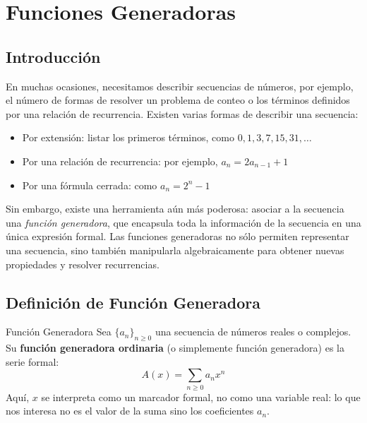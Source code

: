 

\section{Funciones Generadoras}
\subsection{Introducción}

En muchas ocasiones, necesitamos describir secuencias de números, por ejemplo, el número de formas de resolver un problema de conteo o los términos definidos por una relación de recurrencia. Existen varias formas de describir una secuencia:

\begin{itemize}
    \item Por extensión: listar los primeros términos, como $0, 1, 3, 7, 15, 31, \ldots$
    \item Por una relación de recurrencia: por ejemplo, $a_n = 2a_{n-1} + 1$
    \item Por una fórmula cerrada: como $a_n = 2^n - 1$
\end{itemize}

Sin embargo, existe una herramienta aún más poderosa: asociar a la secuencia una \emph{función generadora}, que encapsula toda la información de la secuencia en una única expresión formal. Las funciones generadoras no sólo permiten representar una secuencia, sino también manipularla algebraicamente para obtener nuevas propiedades y resolver recurrencias.

\subsection{Definición de Función Generadora}

\begin{definitionblock}{Función Generadora}
Sea $\{a_n\}_{n \geq 0}$ una secuencia de números reales o complejos. Su \textbf{función generadora ordinaria} (o simplemente función generadora) es la serie formal:
\[
A(x) = \sum_{n \geq 0} a_n x^n
\]
Aquí, $x$ se interpreta como un marcador formal, no como una variable real: lo que nos interesa no es el valor de la suma sino los coeficientes $a_n$.
\end{definitionblock}


